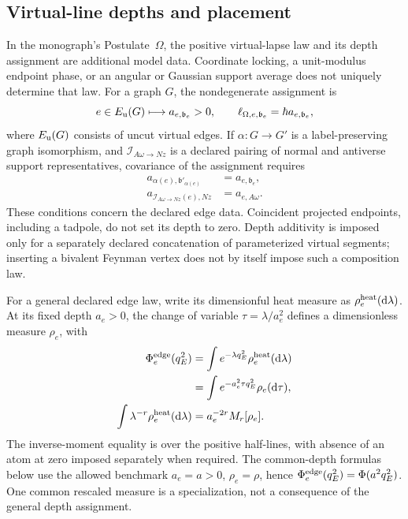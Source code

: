 \documentclass[final,5p,times,twocolumn,numbers,nopreprintline]{elsarticle}
\numberwithin{equation}{section}
\theoremstyle{definition}
\theoremstyle{remark}
\newcommand{\dd}{\mathop{}\!\mathrm d}
\newcommand{\bb}{\mathfrak b}
\newcommand{\Ph}{\Phi}
\begin{document}
\subsection{Virtual-line depths and placement}
In the monograph's Postulate~\(\Omega\), the positive virtual-lapse
law and its depth assignment are additional model data. Coordinate
locking, a unit-modulus endpoint phase, or an angular or Gaussian
support average does not uniquely determine that law.
For a graph \(G\), the nondegenerate assignment is
\begin{equation}
 e\in E_{\rm u}(G)\longmapsto a_{e,\bb_e}>0,
 \qquad \ell_{\Omega,e,\bb_e}=\hbar a_{e,\bb_e},
 \label{eq:virtual-edge-depths}
\end{equation}
where \(E_{\rm u}(G)\) consists of uncut virtual edges. If
\(\alpha:G\to G'\) is a label-preserving graph isomorphism, and
\(\mathcal I_{A\omega\to Nz}\) is a declared pairing of normal
and antiverse support representatives, covariance of the assignment
requires
\begin{align}
 a_{\alpha(e),\bb'_{\alpha(e)}}&=a_{e,\bb_e},
 \label{eq:depth-isomorphism-covariance}\\
 a_{\mathcal I_{A\omega\to Nz}(e),Nz}&=a_{e,A\omega}.
 \label{eq:depth-pairing-covariance}
\end{align}
These conditions concern the declared edge data. Coincident projected
endpoints, including a tadpole, do not set its depth to zero.
Depth additivity is imposed only for a separately declared concatenation
of parameterized virtual segments; inserting a bivalent Feynman vertex
does not by itself impose such a composition law.

For a general declared edge law, write its dimensionful heat measure
as \(\rho^{\rm heat}_e(\dd\lambda)\). At its fixed depth
\(a_e>0\), the change of variable \(\tau=\lambda/a_e^2\)
defines a dimensionless measure \(\rho_e\), with
\[
\begin{aligned}
 \Phi^{\rm edge}_e(q_E^2)
 &=\int e^{-\lambda q_E^2}\rho^{\rm heat}_e(\dd\lambda)\\
 &=\int e^{-a_e^2\tau q_E^2}\rho_e(\dd\tau),\\
 \int\lambda^{-r}\rho^{\rm heat}_e(\dd\lambda)
 &=a_e^{-2r}M_r[\rho_e].
\end{aligned}
\]
The inverse-moment equality is over the positive half-lines, with
absence of an atom at zero imposed separately when required.
The common-depth formulas below use the allowed benchmark
\(a_e=a>0\), \(\rho_e=\rho\), hence
\(\Phi^{\rm edge}_e(q_E^2)=\Ph(a^2q_E^2)\).
One common rescaled measure is a specialization, not a consequence
of the general depth assignment.
\end{document}
